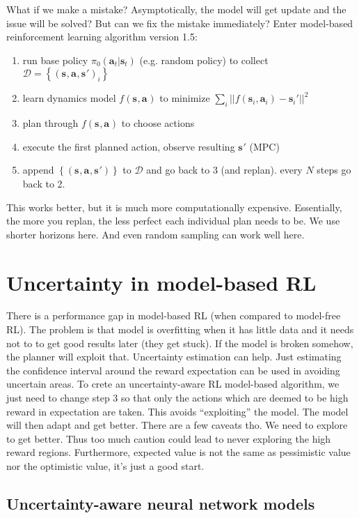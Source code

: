\documentclass{report}
\begin{document}
What if we make a mistake?
Asymptotically, the model will get update and the issue will be solved?
But can we fix the mistake immediately?
Enter model-based reinforcement learning algorithm version 1.5:
\begin{enumerate}
		\item run base policy $ \pi_0 (\bm{a}_t| \bm{s}_t)  $ (e.g. random policy) to collect $ \mathcal{D} = \left\{ \left( \bm{s}_{}, \bm{a}_{}, \bm{s}_{}' \right)_i  \right\}  $ 
		\item learn dynamics model $f(\bm{s}_{}, \bm{a}_{})$ to minimize $ \sum_{i}^{} || f (\bm{s}_{i}, \bm{a}_{i} ) - \bm{s}_{i}'||^2$ 
		\item plan through $f(\bm{s}_{}, \bm{a}_{})$ to choose actions
		\item execute the first planned action, observe resulting $ \bm{s}_{}' $ (MPC)
		\item append $\left\{ \left( \bm{s}_{}, \bm{a}_{}, \bm{s}_{}' \right)  \right\}  $ to $\mathcal{D}$ and go back to 3 (and replan). every $N$ steps go back to 2.
\end{enumerate}
This works better, but it is much more computationally expensive.
Essentially, the more you replan, the less perfect each individual plan needs to be.
We use shorter horizons here.
And even random sampling can work well here.

\section{Uncertainty in model-based RL}
There is a performance gap in model-based RL (when compared to model-free RL).
The problem is that model is overfitting when it has little data and it needs not to to get good results later (they get stuck).
If the model is broken somehow, the planner will exploit that.
Uncertainty estimation can help. Just estimating the confidence interval around the reward expectation can be
used in avoiding uncertain areas.
To crete an uncertainty-aware RL model-based algorithm, we just need to change step 3
so that only the actions which are deemed to be high reward in expectation are taken. This avoids ``exploiting'' the model.
The model will then adapt and get better.
There are a few caveats tho.
We need to explore to get better. Thus too much caution could lead to never exploring the high reward regions.
Furthermore, expected value is not the same as pessimistic value nor the optimistic value,
it's just a good start.

\subsection{Uncertainty-aware neural network models}
\end{document}
